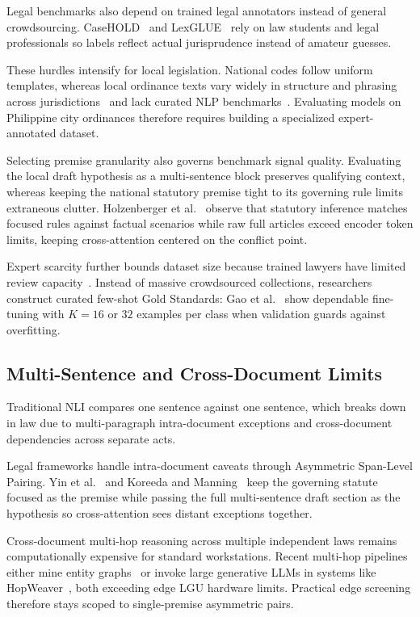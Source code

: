     Legal benchmarks also depend on trained legal annotators instead of general crowdsourcing. CaseHOLD~\cite{zheng2021when} and LexGLUE~\cite{chalkidis2022lexglue} rely on law students and legal professionals so labels reflect actual jurisprudence instead of amateur guesses.

    These hurdles intensify for local legislation. National codes follow uniform templates, whereas local ordinance texts vary widely in structure and phrasing across jurisdictions~\cite{campos2026nlp} and lack curated NLP benchmarks~\cite{campos2026citilink}. Evaluating models on Philippine city ordinances therefore requires building a specialized expert-annotated dataset.

    Selecting premise granularity also governs benchmark signal quality. Evaluating the local draft hypothesis as a multi-sentence block preserves qualifying context, whereas keeping the national statutory premise tight to its governing rule limits extraneous clutter. Holzenberger et al.~\cite{holzenberger2020a} observe that statutory inference matches focused rules against factual scenarios while raw full articles exceed encoder token limits, keeping cross-attention centered on the conflict point.

    Expert scarcity further bounds dataset size because trained lawyers have limited review capacity~\cite{zhong2020how}. Instead of massive crowdsourced collections, researchers construct curated few-shot Gold Standards: Gao et al.~\cite{gao2021making} show dependable fine-tuning with $K = 16$ or $32$ examples per class when validation guards against overfitting.

    \subsection{Multi-Sentence and Cross-Document Limits}
    Traditional NLI compares one sentence against one sentence, which breaks down in law due to multi-paragraph intra-document exceptions and cross-document dependencies across separate acts.

    Legal frameworks handle intra-document caveats through Asymmetric Span-Level Pairing. Yin et al.~\cite{yin2021docnli} and Koreeda and Manning~\cite{koreeda2021contract} keep the governing statute focused as the premise while passing the full multi-sentence draft section as the hypothesis so cross-attention sees distant exceptions together.

    Cross-document multi-hop reasoning across multiple independent laws remains computationally expensive for standard workstations. Recent multi-hop pipelines either mine entity graphs~\cite{lu2023multi} or invoke large generative LLMs in systems like HopWeaver~\cite{shen2025hopweaver}, both exceeding edge LGU hardware limits. Practical edge screening therefore stays scoped to single-premise asymmetric pairs.

